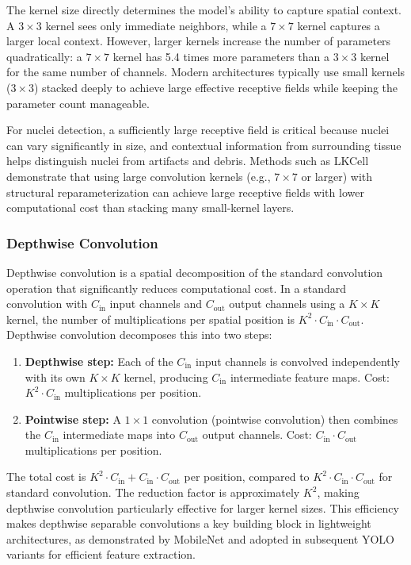 The kernel size directly determines the model's ability to capture spatial context. A $3 \times 3$ kernel sees only immediate neighbors, while a $7 \times 7$ kernel captures a larger local context. However, larger kernels increase the number of parameters quadratically: a $7 \times 7$ kernel has 5.4 times more parameters than a $3 \times 3$ kernel for the same number of channels. Modern architectures typically use small kernels ($3 \times 3$) stacked deeply to achieve large effective receptive fields while keeping the parameter count manageable.

For nuclei detection, a sufficiently large receptive field is critical because nuclei can vary significantly in size, and contextual information from surrounding tissue helps distinguish nuclei from artifacts and debris. Methods such as LKCell \cite{cui2024lkcell} demonstrate that using large convolution kernels (e.g., $7 \times 7$ or larger) with structural reparameterization can achieve large receptive fields with lower computational cost than stacking many small-kernel layers.

\subsubsection{Depthwise Convolution}
\label{sec:depthwise-conv}

Depthwise convolution is a spatial decomposition of the standard convolution operation that significantly reduces computational cost. In a standard convolution with $C_{\text{in}}$ input channels and $C_{\text{out}}$ output channels using a $K \times K$ kernel, the number of multiplications per spatial position is $K^2 \cdot C_{\text{in}} \cdot C_{\text{out}}$. Depthwise convolution decomposes this into two steps:

\begin{enumerate}
	\item \textbf{Depthwise step:} Each of the $C_{\text{in}}$ input channels is convolved independently with its own $K \times K$ kernel, producing $C_{\text{in}}$ intermediate feature maps. Cost: $K^2 \cdot C_{\text{in}}$ multiplications per position.
	\item \textbf{Pointwise step:} A $1 \times 1$ convolution (pointwise convolution) then combines the $C_{\text{in}}$ intermediate maps into $C_{\text{out}}$ output channels. Cost: $C_{\text{in}} \cdot C_{\text{out}}$ multiplications per position.
\end{enumerate}

The total cost is $K^2 \cdot C_{\text{in}} + C_{\text{in}} \cdot C_{\text{out}}$ per position, compared to $K^2 \cdot C_{\text{in}} \cdot C_{\text{out}}$ for standard convolution. The reduction factor is approximately $K^2$, making depthwise convolution particularly effective for larger kernel sizes. This efficiency makes depthwise separable convolutions a key building block in lightweight architectures, as demonstrated by MobileNet \cite{howard2017mobilenets} and adopted in subsequent YOLO variants for efficient feature extraction.

